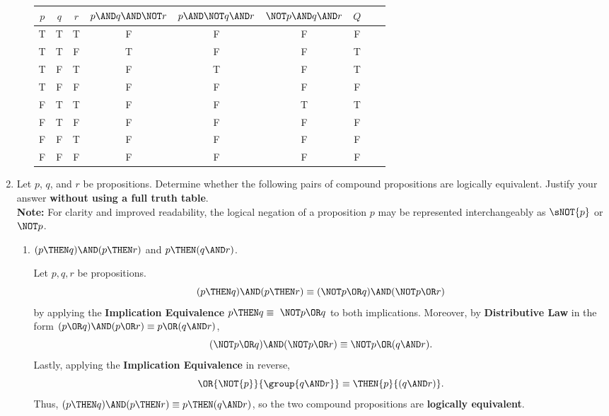 \begin{enumerate}
\begin{enumerate}
\begin{subanswer}
      \begin{center}
        \begin{tabular}{|c|c|c|c|c|c|c|c|c|}
        \hline
        $p$ & $q$ & $r$ & $p \AND q \AND \NOT r$ & $p \AND \NOT q \AND r$ & $\NOT p \AND q \AND r$ & $Q$ \\
        \hline
        T & T & T & F & F & F & F \\
        T & T & F & T & F & F & T \\
        T & F & T & F & T & F & T \\
        T & F & F & F & F & F & F \\
        F & T & T & F & F & T & T \\
        F & T & F & F & F & F & F \\
        F & F & T & F & F & F & F \\
        F & F & F & F & F & F & F \\
        \hline
        \end{tabular}
      \end{center}
    \end{subanswer}
  \end{enumerate}


  \newpage




  \item Let $p$, $q$, and $r$ be propositions.  Determine whether the 
  following pairs of compound propositions are logically equivalent.
  Justify your answer \textbf{without using a full truth table}.\\
  {\color{redcolor}\textbf{Note:} For clarity and improved readability, 
  the logical negation of a proposition $p$ may be represented 
  interchangeably as $\sNOT{p}$ or $\NOT p$.}
  \begin{enumerate}
    \item $(p \THEN q) \AND (p \THEN r)$ and $p \THEN (q \AND r)$.
    \begin{subprove}
      Let \(p,q,r\) be propositions. 
      \[
        (p\THEN q)\AND(p\THEN r) \equiv (\NOT p\OR q)\AND(\NOT p\OR r)
      \]
      by applying the \textbf{Implication Equivalence} \(p\THEN q\equiv~\NOT p\OR q\) to both implications.
      Moreover, by \textbf{Distributive Law} in the form \((p\OR q)\AND(p\OR r)\equiv p\OR(q\AND r)\), 
      \[
        (\NOT p\OR q)\AND(\NOT p\OR r) \equiv \NOT p\OR(q\AND r).
      \]
      Lastly, applying the \textbf{Implication Equivalence} in reverse,
      \[
        \OR{\NOT{p}}{\group{q\AND r}}\equiv\THEN{p}{(q\AND r)}.
      \]
      Thus, \((p\THEN q)\AND(p\THEN r)\equiv p\THEN(q\AND r)\), so the two compound propositions are \textbf{logically equivalent}. 
    \end{subprove}


\end{enumerate}
\end{enumerate}
